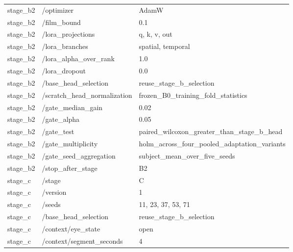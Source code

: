 \begin{longtable}{p{.65in}p{2.8in}p{3.2in}}
stage\_\allowbreak{}b2 & /optimizer & AdamW \\
stage\_\allowbreak{}b2 & /film\_\allowbreak{}bound & 0.1 \\
stage\_\allowbreak{}b2 & /lora\_\allowbreak{}projections & q, k, v, out \\
stage\_\allowbreak{}b2 & /lora\_\allowbreak{}branches & spatial, temporal \\
stage\_\allowbreak{}b2 & /lora\_\allowbreak{}alpha\_\allowbreak{}over\_\allowbreak{}rank & 1.0 \\
stage\_\allowbreak{}b2 & /lora\_\allowbreak{}dropout & 0.0 \\
stage\_\allowbreak{}b2 & /base\_\allowbreak{}head\_\allowbreak{}selection & reuse\_\allowbreak{}stage\_\allowbreak{}b\_\allowbreak{}selection \\
stage\_\allowbreak{}b2 & /scratch\_\allowbreak{}head\_\allowbreak{}normalization & frozen\_\allowbreak{}B0\_\allowbreak{}training\_\allowbreak{}fold\_\allowbreak{}statistics \\
stage\_\allowbreak{}b2 & /gate\_\allowbreak{}median\_\allowbreak{}gain & 0.02 \\
stage\_\allowbreak{}b2 & /gate\_\allowbreak{}alpha & 0.05 \\
stage\_\allowbreak{}b2 & /gate\_\allowbreak{}test & paired\_\allowbreak{}wilcoxon\_\allowbreak{}greater\_\allowbreak{}than\_\allowbreak{}stage\_\allowbreak{}b\_\allowbreak{}head \\
stage\_\allowbreak{}b2 & /gate\_\allowbreak{}multiplicity & holm\_\allowbreak{}across\_\allowbreak{}four\_\allowbreak{}pooled\_\allowbreak{}adaptation\_\allowbreak{}variants \\
stage\_\allowbreak{}b2 & /gate\_\allowbreak{}seed\_\allowbreak{}aggregation & subject\_\allowbreak{}mean\_\allowbreak{}over\_\allowbreak{}five\_\allowbreak{}seeds \\
stage\_\allowbreak{}b2 & /stop\_\allowbreak{}after\_\allowbreak{}stage & B2 \\
stage\_\allowbreak{}c & /stage & C \\
stage\_\allowbreak{}c & /version & 1 \\
stage\_\allowbreak{}c & /seeds & 11, 23, 37, 53, 71 \\
stage\_\allowbreak{}c & /base\_\allowbreak{}head\_\allowbreak{}selection & reuse\_\allowbreak{}stage\_\allowbreak{}b\_\allowbreak{}selection \\
stage\_\allowbreak{}c & /context/eye\_\allowbreak{}state & open \\
stage\_\allowbreak{}c & /context/segment\_\allowbreak{}seconds & 4 \\

\end{longtable}
